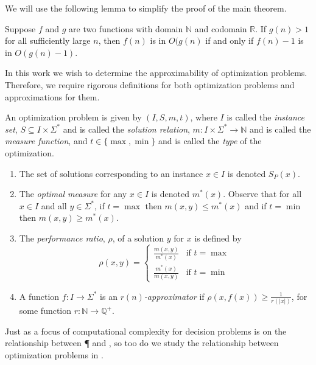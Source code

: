 \documentclass{article}
\begin{document}
We will use the following lemma to simplify the proof of the main theorem.

\begin{lemma}\label{lem:bigo}
  Suppose $f$ and $g$ are two functions with domain $\mathbb{N}$ and codomain $\mathbb{R}$.
  If $g(n) > 1$ for all sufficiently large $n$, then $f(n)$ is in $O(g(n)$ if and only if $f(n) - 1$ is in $O(g(n) - 1)$.
\end{lemma}

In this work we wish to determine the approximability of optimization problems.
Therefore, we require rigorous definitions for both optimization problems and approximations for them.

\begin{definition}
  An optimization problem is given by $(I, S, m, t)$, where $I$ is called the \emph{instance set}, $S \subseteq I \times \Sigma^*$ and is called the \emph{solution relation}, $m \colon I \times \Sigma^* \to \mathbb{N}$ and is called the \emph{measure function}, and $t\in\{\max, \min\}$ and is called the \emph{type} of the optimization.
  \begin{enumerate}
  \item The set of solutions corresponding to an instance $x \in I$ is denoted $S_P(x)$.
  \item The \emph{optimal measure} for any $x \in I$ is denoted $m^*(x)$.
    Observe that for all $x \in I$ and all $y \in \Sigma^*$, if $t = \max$ then $m(x, y) \leq m^*(x)$ and if $t = \min$ then $m(x, y) \geq m^*(x)$.
  \item The \emph{performance ratio}, $\rho$, of a solution $y$ for $x$ is defined by
    \begin{equation*}
      \rho(x, y) =
      \begin{cases}
        \frac{m(x, y)}{m^*(x)} & \text{if } t = \max \\
        \frac{m^*(x)}{m(x, y)} & \text{if } t = \min
      \end{cases}
    \end{equation*}
  \item A function $f \colon I \to \Sigma^*$ is an \emph{$r(n)$-approximator} if $\rho(x, f(x)) \geq \frac{1}{r(|x|)}$, for some function $r \colon \mathbb{N} \to \mathbb{Q}^+$.
  \end{enumerate}
\end{definition}

Just as a focus of computational complexity for decision problems is on the relationship between \P{} and \NP{}, so too do we study the relationship between optimization problems in \NP{}.
\end{document}
